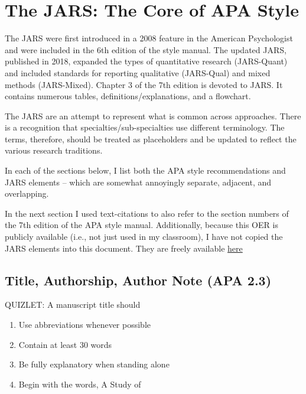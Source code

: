 \documentclass[
  english,
]{book}
\providecommand{\tightlist}{%
  \setlength{\itemsep}{0pt}\setlength{\parskip}{0pt}}
\begin{document}
\hypertarget{the-jars-the-core-of-apa-style}{%
\section{The JARS: The Core of APA Style}\label{the-jars-the-core-of-apa-style}}

The JARS \citep[Journal Article Reporting Standards;][]{appelbaum_journal_2018} were first introduced in a 2008 feature in the American Psychologist \citep{noauthor_reporting_2008} and were included in the 6th edition of the style manual. The updated JARS, published in 2018, expanded the types of quantitative research (JARS-Quant) and included standards for reporting qualitative (JARS-Qual) and mixed methods (JARS-Mixed). Chapter 3 of the 7th edition is devoted to JARS. It contains numerous tables, definitions/explanations, and a flowchart.

The JARS are an attempt to represent what is common across approaches. There is a recognition that specialties/sub-specialties use different terminology. The terms, therefore, should be treated as placeholders and be updated to reflect the various research traditions.

In each of the sections below, I list both the APA style recommendations and JARS elements -- which are somewhat annoyingly separate, adjacent, and overlapping.

In the next section I used text-citations to also refer to the section numbers of the 7th edition of the APA style manual. Additionally, because this OER is publicly available (i.e., not just used in my classroom), I have not copied the JARS elements into this document. They are freely available \href{https://apastyle.apa.org/jars/quantitative}{here}

\hypertarget{title-authorship-author-note-apa-2.3}{%
\subsection{Title, Authorship, Author Note (APA 2.3)}\label{title-authorship-author-note-apa-2.3}}

QUIZLET:
A manuscript title should

\begin{enumerate}
\def\labelenumi{\alph{enumi}.}
\tightlist
\item
  Use abbreviations whenever possible
\item
  Contain at least 30 words
\item
  Be fully explanatory when standing alone
\item
  Begin with the words, A Study of
\end{enumerate}
\end{document}
